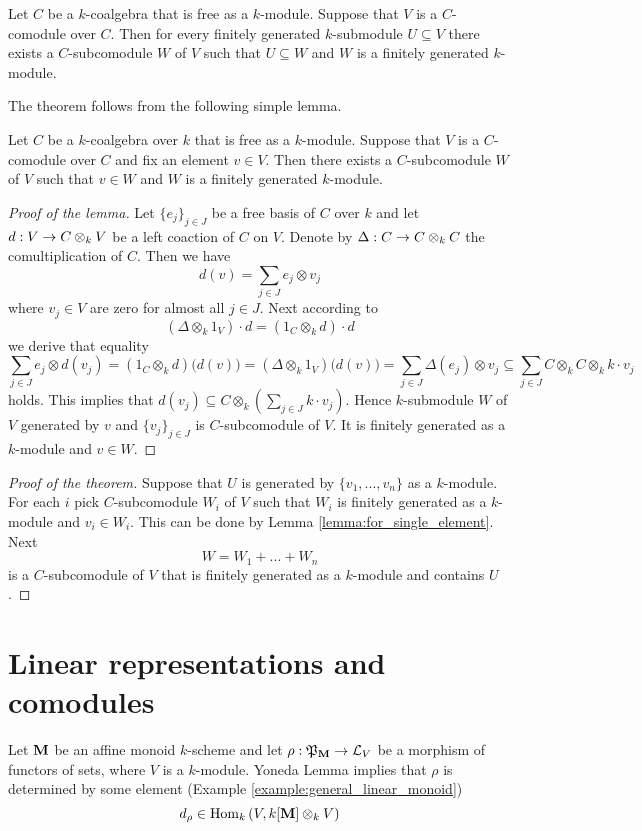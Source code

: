 \begin{theorem}\label{theorem:rationality_of_comodules}
Let $C$ be a $k$-coalgebra that is free as a $k$-module. Suppose that $V$ is a $C$-comodule over $C$. Then for every finitely generated $k$-submodule $U \subseteq V$ there exists a $C$-subcomodule $W$ of $V$ such that $U \subseteq W$ and $W$ is a finitely generated $k$-module.
\end{theorem}
\noindent
The theorem follows from the following simple lemma.

\begin{lemma}\label{lemma:for_single_element}
Let $C$ be a $k$-coalgebra over $k$ that is free as a $k$-module. Suppose that $V$ is a $C$-comodule over $C$ and fix an element $v\in V$. Then there exists a $C$-subcomodule $W$ of $V$ such that $v\in W$ and $W$ is a finitely generated $k$-module.
\end{lemma}
\begin{proof}[Proof of the lemma]
Let $\{e_j\}_{j\in J}$ be a free basis of $C$ over $k$ and let $d:V\rightarrow C\otimes_{k}V$ be a left coaction of $C$ on $V$. Denote by $\Delta:C\rightarrow C\otimes_{k}C$ the comultiplication of $C$. Then we have
$$d(v)=\sum_{j\in J}e_j\otimes v_{j}$$
where $v_j\in V$ are zero for almost all $j\in J$. Next according to
$$\left(\Delta\otimes_{k}1_V\right)\cdot d=\left(1_C\otimes_{k}d\right)\cdot d$$
we derive that equality
$$\sum_{j\in J}e_j\otimes d(v_{j})=(1_C\otimes_{k}d)\big(d(v)\big)=(\Delta\otimes_{k}1_V)\big(d(v)\big)=\sum_{j\in J}\Delta(e_j)\otimes v_{j}\subseteq \sum_{j\in J}C\otimes_{k}C\otimes_{k}k\cdot v_j$$
holds. This implies that $d(v_j)\subseteq C\otimes_{k}\left(\sum_{j\in J}k\cdot v_j\right)$. Hence $k$-submodule $W$ of $V$ generated by $v$ and $\{v_j\}_{j\in J}$ is $C$-subcomodule of $V$. It is finitely generated as a $k$-module and $v\in W$.
\end{proof}

\begin{proof}[Proof of the theorem]
Suppose that $U$ is generated by $\{v_1,...,v_n\}$ as a $k$-module. For each $i$ pick $C$-subcomodule $W_i$ of $V$ such that $W_i$ is finitely generated as a $k$-module and $v_i\in W_i$. This can be done by Lemma \ref{lemma:for_single_element}. Next
$$W = W_1+...+W_n$$
is a $C$-subcomodule of $V$ that is finitely generated as a $k$-module and contains $U$.
\end{proof}

\section{Linear representations and comodules}
\noindent
Let $\mathbf{M}$ be an affine monoid $k$-scheme and let $\rho:{\mathfrak P}_{\mathbf{M}}\rightarrow {\mathcal L}_V$ be a morphism of functors of sets, where $V$ is a $k$-module. Yoneda Lemma implies that $\rho$ is determined by some element (Example \ref{example:general_linear_monoid}) 
$$d_{\rho}\in \mathrm{Hom}_{k}\left(V,k[\mathbf{M}]\otimes_{k}V\right)$$

